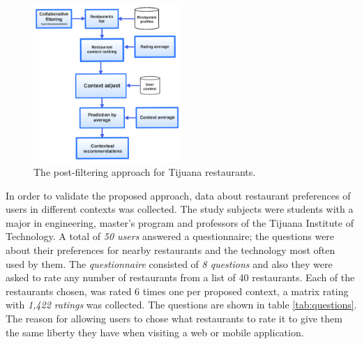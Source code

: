 \begin{figure}
\centering
\captionsetup{font=footnotesize}
\setlength\fboxsep{0pt}
\includegraphics[width=0.50\textwidth]{img/posfil.png}
\caption{The post-filtering approach for Tijuana restaurants.}
\label{fig:postfiltering}     
\end{figure}
In order to validate the proposed approach, data about restaurant
preferences of users in different contexts was collected. The study
subjects were students  with a major in engineering,  
master’s program and professors of the Tijuana Institute of
Technology. A total of \textit{50 users} answered a questionnaire; the
questions were about their preferences for nearby restaurants and the
technology most often used by them. The \textit{questionnaire} consisted 
of \textit{8 questions} and also they were asked to rate any number of restaurants from a list of 40 restaurants.
Each of the restaurants chosen, was rated 6 times one per proposed 
context, a matrix rating with \textit{1,422 ratings} was collected. The
questions are shown in table \ref{tab:questions}. The reason for allowing
users to chose what restaurants to rate it to give them the same liberty
they have when visiting a web or mobile application. 
